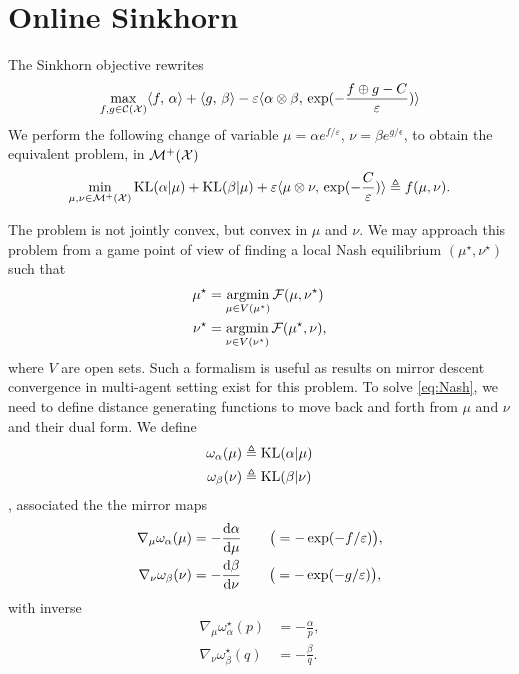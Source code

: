 \documentclass[a4paper, 10pt]{article}
\begin{document}
\section{Online Sinkhorn}

The Sinkhorn objective rewrites
\begin{equation}
    \max_{f, g \in \mathcal{C}(\mathcal{X})} \langle f,\,\alpha\rangle + \langle g,\,\beta\rangle
     - \varepsilon \langle \alpha \otimes \beta,\,\exp(-\frac{f \oplus g - C}{\varepsilon})
     \rangle
\end{equation}
We perform the following change of variable $\mu = \alpha e^{f / \varepsilon}$,
$\nu = \beta e^{g / \epsilon}$, to obtain the equivalent problem, in $\mathcal{M}^+(\mathcal{X})$
\begin{equation}
    \min_{\mu,\nu \in \mathcal{M}^+(\mathcal{X})} \text{KL}(\alpha|\mu) + \text{KL}(\beta|\mu) + 
    \varepsilon \langle \mu \otimes \nu,\,\exp(-\frac{C}{\varepsilon})\rangle \triangleq f(\mu, \nu).
\end{equation}

The problem is not jointly convex, but convex in $\mu$ and $\nu$.
We may approach this problem from a game point of view of finding
 a local Nash equilibrium $(\mu^\star,\nu^\star)$ such that
\begin{align}\label{eq:Nash}
    \mu^\star &= \operatorname*{argmin}_{\mu \in V(\mu^\star)} \mathcal{F}(\mu, \nu^\star) \\
    \nu^\star &= \operatorname*{argmin}_{\nu \in V(\nu^\star)} \mathcal{F}(\mu^\star, \nu),
\end{align}
where $V$ are open sets. Such a formalism is useful as results on mirror descent
convergence in multi-agent setting exist for this problem. To solve
\eqref{eq:Nash}, we need to define distance generating functions to move back
and forth from $\mu$ and $\nu$ and their dual form. We define
\begin{align}
    \omega_\alpha(\mu) &\triangleq \text{KL}(\alpha | \mu) \\
    \omega_\beta(\nu) &\triangleq \text{KL}(\beta | \nu) \\
\end{align},
associated the the mirror maps
\begin{align}
    \nabla_\mu \omega_\alpha(\mu) &= 
    - \frac{\textrm{d}\alpha}{\textrm{d}\mu} \qquad \big( = - \exp(-f / \varepsilon) \big), \\
    \nabla_\nu \omega_\beta(\nu) &= 
    - \frac{\textrm{d}\beta}{\textrm{d}\nu} \qquad \big( = - \exp(-g / \varepsilon) \big),
\end{align}
with inverse
\begin{align}
    \nabla_\mu \omega^\star_\alpha(p) &= - \frac{\alpha}{p}, \\
    \nabla_\nu \omega^\star_\beta(q) &= - \frac{\beta}{q}.
\end{align}
\end{document}
